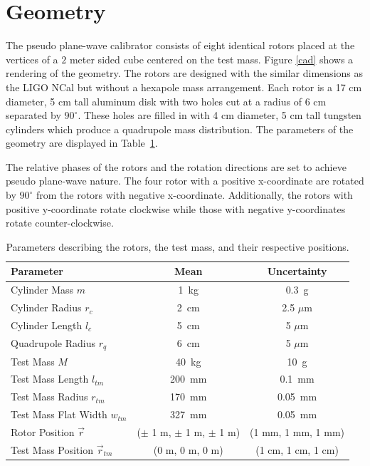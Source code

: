 \documentclass[twocolumn]{revtex4-1}
\begin{document}
\section{Geometry}

The pseudo plane-wave calibrator consists of eight identical rotors placed at the vertices of a $2$ meter sided cube centered on the test mass. Figure \ref{cad} shows a rendering of the geometry. The rotors are designed with the similar dimensions as the LIGO NCal \cite{ncal} but without a hexapole mass arrangement. Each rotor is a 17 cm diameter, 5 cm tall aluminum disk with two holes cut at a radius of 6 cm separated by $90^\circ$. These holes are filled in with 4 cm diameter, 5 cm tall  tungsten cylinders which produce a quadrupole mass distribution. The parameters of the geometry are displayed in Table~\ref{param}.

The relative phases of the rotors and the rotation directions are set to achieve pseudo plane-wave nature. The four rotor with a positive x-coordinate are rotated by $90^\circ$ from the rotors with negative x-coordinate. Additionally, the rotors with positive y-coordinate rotate clockwise while those with negative y-coordinates rotate counter-clockwise. 

\begin{widetext}
\begingroup
\setlength{\tabcolsep}{10pt} %
\renewcommand{\arraystretch}{1.5} %

\begin{table}[h!]
\begin{center}
\begin{tabular}{ |l|c|c| }
\hline
 Parameter & Mean & Uncertainty \\
 \hline
Cylinder Mass $m$ & 1~kg & 0.3~g \\
Cylinder Radius $r_c$& 2~cm & 2.5 $\mu$m \\
Cylinder Length $l_c$& 5~cm & 5 $\mu$m \\
Quadrupole Radius $r_{q}$ & 6~cm & 5 $\mu$m \\
Test Mass $M$ & 40~kg & 10~g \\
Test Mass Length $l_{tm}$& 200~mm & 0.1~mm\\
Test Mass Radius $r_{tm}$& 170~mm & 0.05~mm\\
Test Mass Flat Width $w_{tm}$& 327~mm & 0.05~mm\\
Rotor Position $\vec{r}$& ($\pm$ 1 m, $\pm$ 1 m, $\pm$ 1 m) & (1 mm, 1 mm, 1 mm) \\
Test Mass Position $\vec{r}_{tm}$& (0 m, 0 m, 0 m) & (1 cm, 1 cm, 1 cm) \\
 \hline

 \end{tabular}
 \caption{Parameters describing the rotors, the test mass, and their respective positions.}\label{param}
 \end{center}

\end{table}
\endgroup
\end{widetext}
\end{document}

